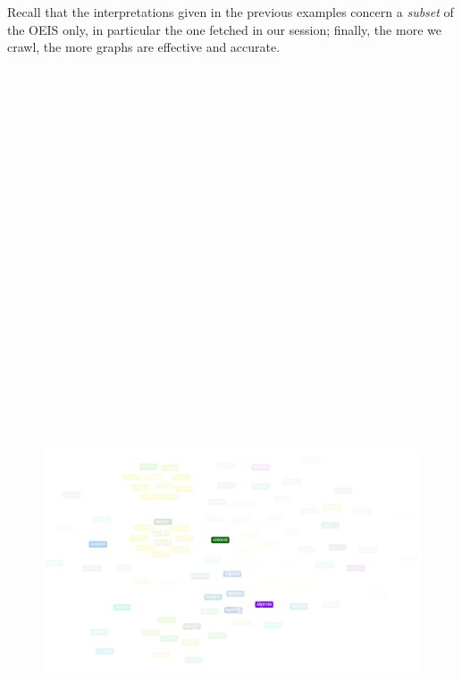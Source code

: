\begin{remark}
Recall that the interpretations given in the previous examples concern a
\textit{subset} of the OEIS only, in particular the one fetched in our session;
finally, the more we crawl, the more graphs are effective and accurate.
\end{remark}

\begin{figure}
\centering
\begin{sideways}
\includegraphics[width=20cm, height=35cm]{OEIS/coloured}

\end{sideways}
\end{figure}
